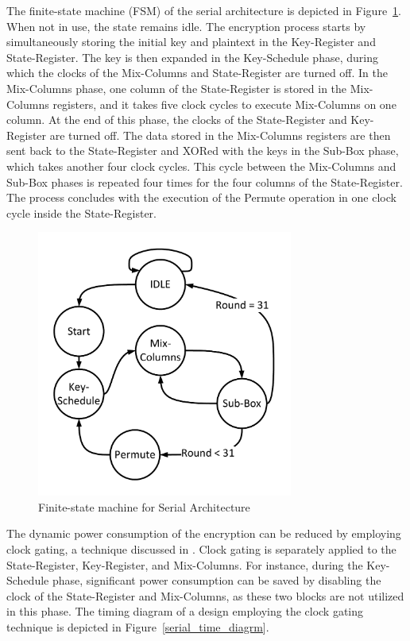 \documentclass[sn-basic]{sn-jnl}%
\begin{document}
The finite-state machine (FSM) of the serial architecture is depicted in Figure~\ref{serial_fsm_fig}.
When not in use, the state remains idle.
The encryption process starts by simultaneously storing the initial key and plaintext in the Key-Register and State-Register.
The key is then expanded in the Key-Schedule phase, during which the clocks of the Mix-Columns and State-Register are turned off.
In the Mix-Columns phase, one column of the State-Register is stored in the Mix-Columns registers, and it takes five clock cycles to execute Mix-Columns on one column.
At the end of this phase, the clocks of the State-Register and Key-Register are turned off.
The data stored in the Mix-Columns registers are then sent back to the State-Register and XORed with the keys in the Sub-Box phase, which takes another four clock cycles.
This cycle between the Mix-Columns and Sub-Box phases is repeated four times for the four columns of the State-Register.
The process concludes with the execution of the Permute operation in one clock cycle inside the State-Register.

\begin{figure}[h]%
    \centering
    \includegraphics[width=0.75\textwidth]{serial-fsm.pdf}
    \caption{Finite-state machine for Serial Architecture}\label{serial_fsm_fig}
\end{figure}

The dynamic power consumption of the encryption can be reduced by employing clock gating, a technique discussed in \cite{shahbazi2020area}.
Clock gating is separately applied to the State-Register, Key-Register, and Mix-Columns.
For instance, during the Key-Schedule phase, significant power consumption can be saved by disabling the clock of the State-Register and Mix-Columns, as these two blocks are not utilized in this phase.
The timing diagram of a design employing the clock gating technique is depicted in Figure~\ref{serial_time_diagrm}.
\end{document}
